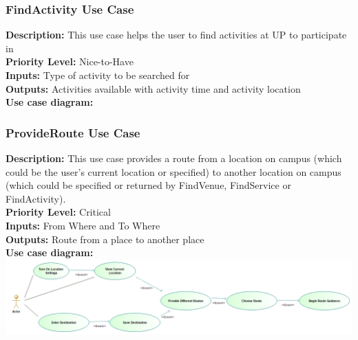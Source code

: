 \documentclass[a4paper,12pt]{article}
\begin{document}
\subsubsection{FindActivity Use Case}
\textbf{Description: } This use case helps the user to find activities at UP to participate in\\
\textbf{Priority Level: } Nice-to-Have\\
\textbf{Inputs:} Type of activity to be searched for\\
\textbf{Outputs:} Activities available with activity time and activity location\\
\textbf{Use case diagram: }\\

\subsubsection{ProvideRoute Use Case}
\textbf{Description: } This use case provides a route from a location on campus (which could be the user's current location or specified) to another location on campus (which could be specified or returned by FindVenue, FindService or FindActivity).\\
\textbf{Priority Level: } Critical\\
\textbf{Inputs:} From Where and To Where\\
\textbf{Outputs:} Route from a place to another place\\
\textbf{Use case diagram: }\\
\includegraphics[width=\textwidth]{images/provide_route.png}
\end{document}
